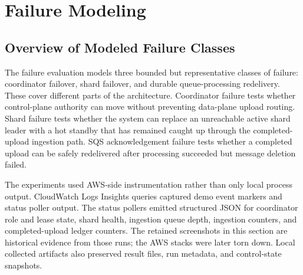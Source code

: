 \documentclass[conference]{IEEEtran}
\begin{document}
\section{Failure Modeling}

\subsection{Overview of Modeled Failure Classes}

The failure evaluation models three bounded but representative classes of failure: coordinator failover, shard failover, and durable queue-processing redelivery. These cover different parts of the architecture. Coordinator failure tests whether control-plane authority can move without preventing data-plane upload routing. Shard failure tests whether the system can replace an unreachable active shard leader with a hot standby that has remained caught up through the completed-upload ingestion path. SQS acknowledgement failure tests whether a completed upload can be safely redelivered after processing succeeded but message deletion failed.

The experiments used AWS-side instrumentation rather than only local process output. CloudWatch Logs Insights queries captured demo event markers and status poller output. The status pollers emitted structured JSON for coordinator role and lease state, shard health, ingestion queue depth, ingestion counters, and completed-upload ledger counters. The retained screenshots in this section are historical evidence from those runs; the AWS stacks were later torn down. Local collected artifacts also preserved result files, run metadata, and control-state snapshots.
\end{document}

